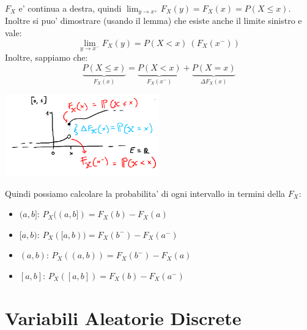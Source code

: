     $ F_X $ e' continua a destra, quindi $ \lim_{y \to x^{+}}F_X(y) = F_X(x) = P(X \leq x)$. Inoltre si puo' dimostrare (usando il lemma) che esiste anche il limite sinistro e vale:
    \[
      \lim_{y\to x^{-}} F_X(y) = P(X < x)\ (F_X(x^{-}))
    \]
    Inoltre, sappiamo che:
    \[
      \underbrace{P(X \leq x)}_{F_X(x)} = \underbrace{P(X < x)}_{F_X(x^{-})} + \underbrace{P(X = x)}_{\Delta F_X(x)}
    \]
    \begin{center}
      \includegraphics[width=0.5\textwidth]{img/2025-03-31-19-35-15.png}
    \end{center}

    Quindi possiamo calcolare la probabilita' di ogni intervallo in termini della $ F_X $:
    \begin{itemize}
      \item $ (a,b] $: $ P_X((a,b]) = F_X(b) - F_X(a) $
      \item $ [a,b) $: $ P_X([a,b)) = F_X(b^{-}) - F_X(a^{-}) $
      \item $ (a,b) $: $ P_X((a,b)) = F_X(b^{-}) - F_X(a) $
      \item $ [a,b] $: $ P_X([a,b]) = F_X(b) - F_X(a^{-}) $
    \end{itemize}


 \section{Variabili Aleatorie Discrete}

